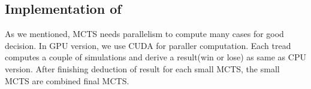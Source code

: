 \subsection{Implementation of \gpu}
As we mentioned, MCTS needs parallelism to compute many cases for good decision. 
In GPU version, we use CUDA for paraller computation. 
Each tread computes a couple of simulations and derive a result(win or lose) as same as CPU version. 
After finishing deduction of result for each small MCTS, the small MCTS are combined final MCTS. 